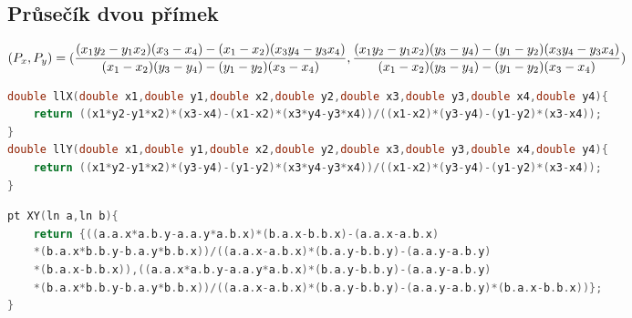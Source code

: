 \documentclass[11pt]{article}
\begin{document}
\subsection{Průsečík dvou přímek}
$(P_x,P_y)=(\dfrac{(x_1y_2-y_1x_2)(x_3-x_4)-(x_1-x_2)(x_3y_4-y_3x_4)}{(x_1-x_2)(y_3-y_4)-(y_1-y_2)(x_3-x_4)},
\\\dfrac{(x_1y_2-y_1x_2)(y_3-y_4)-(y_1-y_2)(x_3y_4-y_3x_4)}{(x_1-x_2)(y_3-y_4)-(y_1-y_2)(x_3-x_4)})$
\vspace{3mm}
\begin{lstlisting}[language=C++]
double llX(double x1,double y1,double x2,double y2,double x3,double y3,double x4,double y4){
    return ((x1*y2-y1*x2)*(x3-x4)-(x1-x2)*(x3*y4-y3*x4))/((x1-x2)*(y3-y4)-(y1-y2)*(x3-x4));
}
double llY(double x1,double y1,double x2,double y2,double x3,double y3,double x4,double y4){
    return ((x1*y2-y1*x2)*(y3-y4)-(y1-y2)*(x3*y4-y3*x4))/((x1-x2)*(y3-y4)-(y1-y2)*(x3-x4));
}
\end{lstlisting}
\begin{lstlisting}[language=C++]
pt XY(ln a,ln b){
    return {((a.a.x*a.b.y-a.a.y*a.b.x)*(b.a.x-b.b.x)-(a.a.x-a.b.x)
    *(b.a.x*b.b.y-b.a.y*b.b.x))/((a.a.x-a.b.x)*(b.a.y-b.b.y)-(a.a.y-a.b.y)
    *(b.a.x-b.b.x)),((a.a.x*a.b.y-a.a.y*a.b.x)*(b.a.y-b.b.y)-(a.a.y-a.b.y)
    *(b.a.x*b.b.y-b.a.y*b.b.x))/((a.a.x-a.b.x)*(b.a.y-b.b.y)-(a.a.y-a.b.y)*(b.a.x-b.b.x))};
}
\end{lstlisting}
\end{document}
